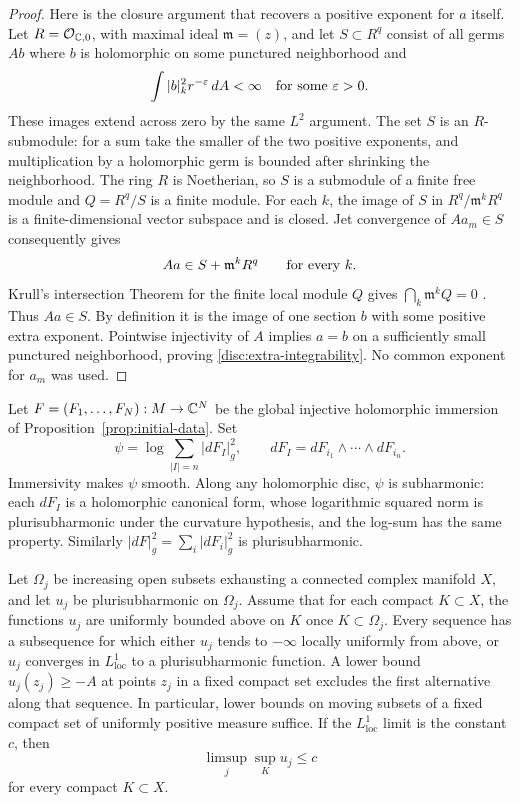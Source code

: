 \begin{proof}
Here is the closure argument that recovers a positive exponent for
$a$ itself.  Let $R=\mathcal O_{\mathbb C,0}$, with maximal ideal
$\mathfrak m=(z)$, and let $S\subset R^q$ consist of all germs $Ab$
where $b$ is holomorphic on some punctured neighborhood and
\[
 \int |b|_k^2r^{-\varepsilon}\,dA<\infty
 \quad\hbox{for some }\varepsilon>0.
\]
These images extend across zero by the same $L^2$ argument.  The set
$S$ is an $R$-submodule: for a sum take the smaller of the two positive
exponents, and multiplication by a holomorphic germ is bounded after
shrinking the neighborhood.  The ring $R$ is Noetherian, so $S$ is a
submodule of a finite free module and $Q=R^q/S$ is a finite module.
For each $k$, the image of $S$ in $R^q/\mathfrak m^kR^q$ is a
finite-dimensional vector subspace and is closed.  Jet convergence of
$Aa_m\in S$ consequently gives
\[
 Aa\in S+\mathfrak m^kR^q\qquad\hbox{for every }k.
\]
Krull's intersection Theorem for the finite local module $Q$ gives
$\bigcap_k\mathfrak m^kQ=0$ \cite[Lemma 10.51.4]{StacksKrull}.
Thus $Aa\in S$.  By definition it is the image of one section $b$
with some positive extra exponent.  Pointwise injectivity of $A$
implies $a=b$ on a sufficiently small punctured neighborhood, proving
\eqref{disc:extra-integrability}.  No common exponent for $a_m$ was
used.
\end{proof}

Let $F=(F_1,\ldots,F_N):M\to\mathbb C^N$ be the global injective
holomorphic immersion of Proposition~\ref{prop:initial-data}.  Set
\[
 \psi=\log\sum_{|I|=n}|dF_I|_g^2,
 \qquad dF_I=dF_{i_1}\wedge\cdots\wedge dF_{i_n}.
\]
Immersivity makes $\psi$ smooth.  Along any holomorphic disc,
$\psi$ is subharmonic: each $dF_I$ is a holomorphic canonical form,
whose logarithmic squared norm is plurisubharmonic under the curvature
hypothesis, and the log-sum has the same property.  Similarly
$|dF|_g^2=\sum_i|dF_i|_g^2$ is plurisubharmonic.

\begin{lemma}\label{lem:psh-compactness-bridge}
Let $\Omega_j$ be increasing open subsets exhausting a connected
complex manifold $X$, and let $u_j$ be plurisubharmonic on $\Omega_j$.
Assume that for each compact $K\subset X$, the functions $u_j$ are
uniformly bounded above on $K$ once $K\subset\Omega_j$.
Every sequence has a subsequence for which either $u_j$ tends to
$-\infty$ locally uniformly from above, or $u_j$ converges in
$L^1_{\mathrm{loc}}$ to a plurisubharmonic function.
A lower bound $u_j(z_j)\ge-A$ at points $z_j$ in a fixed compact set
excludes the first alternative along that sequence.  In particular,
lower bounds on moving subsets of a fixed compact set of uniformly
positive measure suffice.  If the $L^1_{\mathrm{loc}}$ limit is the
constant $c$, then
\[
 \limsup_j\sup_K u_j\le c
\]
for every compact $K\subset X$.
\end{lemma}

